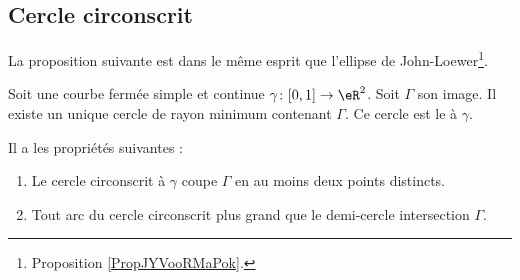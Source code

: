 \subsection{Cercle circonscrit}

La proposition suivante est dans le même esprit que l'ellipse de John-Loewer\footnote{Proposition \ref{PropJYVooRMaPok}.}.
\begin{propositionDef}      \label{PROPDEFooCWESooVbDven} 
    Soit une courbe fermée simple et continue \( \gamma\colon \mathopen[ 0 , 1 \mathclose]\to \eR^2\). Soit \( \Gamma\) son image. Il existe un unique cercle de rayon minimum contenant \( \Gamma\). Ce cercle est le  à \( \gamma\).

    Il a les propriétés suivantes :
    \begin{enumerate}
        \item
            Le cercle circonscrit à \( \gamma\) coupe \( \Gamma\) en au moins deux points distincts.
        \item
            Tout arc du cercle circonscrit plus grand que le demi-cercle intersection \( \Gamma\).
    \end{enumerate}
\end{propositionDef}


